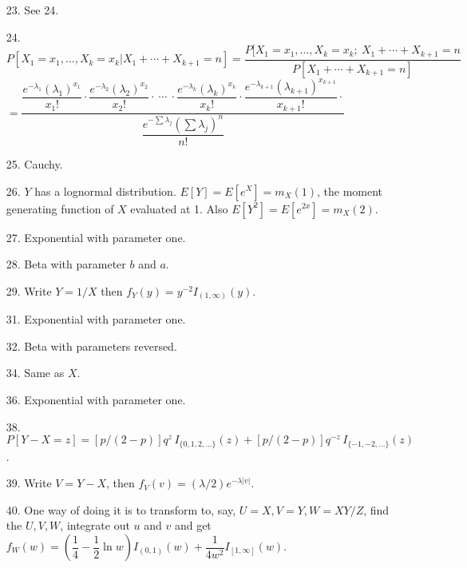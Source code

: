 \begin{enumerate}
	\item[23.] See 24.

	\newpage
	\item[24.] $P[X_1=x_1,\ldots,X_k=x_k\vert X_1+\cdots+X_{k+1}=n] = \dfrac{P[X_1=x_1,\ldots,X_k=x_k;\ X_1+\cdots+X_{k+1}=n}{P[X_1+\cdots+X_{k+1}=n]}$ \\ 
	$=\dfrac{
	\dfrac{e^{-\lambda_1}\left(\lambda_1\right)^{x_1}}{x_1!} \cdot 
	\dfrac{e^{-\lambda_2}\left(\lambda_2\right)^{x_2}}{x_2!} \cdot\ \cdots\ \cdot
	\dfrac{e^{-\lambda_k}\left(\lambda_k\right)^{x_k}}{x_k!} \cdot 
	\dfrac{e^{-\lambda_{k+1}}\left(\lambda_{k+1}\right)^{x_{k+1}}}{x_{k+1}!} \cdot	
	}{\dfrac{e^{-\sum \lambda_j}\left(\sum \lambda_j\right)^n}{n!}}$
	
	\item[25.] Cauchy.
	
	\item[26.] $Y$ has a lognormal distribution. $E[Y]=E[e^X]=m_X(1)$, the moment generating function of $X$ evaluated at 1. Also $E[Y^2]=E[e^{2x}]=m_X(2)$.
	
	\item[27.] Exponential with parameter one.
	
	\item[28.] Beta with parameter $b$ and $a$.
	
	\item[29.] Write $Y=1/X$ then $f_Y(y)=y^{-2}I_{(1,\infty)}(y)$.
	
	\item[31.] Exponential with parameter one.
	
	\item[32.] Beta with parameters reversed.
	
	\item[34.] Same as $X$.
	
	\item[36.] Exponential with parameter one.
	
	\item[38.] $P[Y-X=z] = [p/(2-p)]q^z\,I_{\{0,1,2,\ldots\}}(z) + [p/(2-p)]q^{-z}\,I_{\{-1,-2,\ldots\}}(z)$.
	
	\item[39.] Write $V=Y-X$, then $f_V(v)=(\lambda/2)e^{-\lambda\vert v\vert}$.
	
	\item[40.] One way of doing it is to transform to, say, $U=X, V=Y, W=XY/Z$, find the $U, V, W$, integrate out $u$ and $v$ and get \\
	$f_W(w) = \left(\dfrac{1}{4}-\dfrac{1}{2}\ln w\right)I_{(0,1)}(w) + \dfrac{1}{4w^2}I_{[1,\infty]}(w)$.
	

\end{enumerate}
